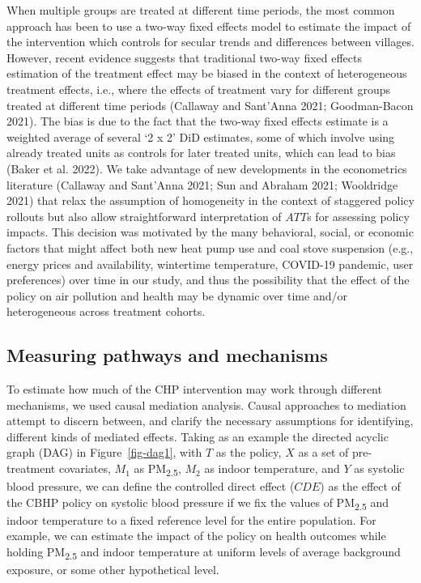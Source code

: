 \documentclass[
  letterpaper,
  DIV=11,
  numbers=noendperiod]{scrartcl}
\begin{document}
When multiple groups are treated at different time periods, the most
common approach has been to use a two-way fixed effects model to
estimate the impact of the intervention which controls for secular
trends and differences between villages. However, recent evidence
suggests that traditional two-way fixed effects estimation of the
treatment effect may be biased in the context of heterogeneous treatment
effects, i.e., where the effects of treatment vary for different groups
treated at different time periods (Callaway and Sant'Anna 2021;
Goodman-Bacon 2021). The bias is due to the fact that the two-way fixed
effects estimate is a weighted average of several `2 x 2' DiD estimates,
some of which involve using already treated units as controls for later
treated units, which can lead to bias (Baker et al. 2022). We take
advantage of new developments in the econometrics literature (Callaway
and Sant'Anna 2021; Sun and Abraham 2021; Wooldridge 2021) that relax
the assumption of homogeneity in the context of staggered policy
rollouts but also allow straightforward interpretation of \(ATT\)s for
assessing policy impacts. This decision was motivated by the many
behavioral, social, or economic factors that might affect both new heat
pump use and coal stove suspension (e.g., energy prices and
availability, wintertime temperature, COVID-19 pandemic, user
preferences) over time in our study, and thus the possibility that the
effect of the policy on air pollution and health may be dynamic over
time and/or heterogeneous across treatment cohorts.

\subsection{Measuring pathways and
mechanisms}\label{measuring-pathways-and-mechanisms}

To estimate how much of the CHP intervention may work through different
mechanisms, we used causal mediation analysis. Causal approaches to
mediation attempt to discern between, and clarify the necessary
assumptions for identifying, different kinds of mediated effects. Taking
as an example the directed acyclic graph (DAG) in Figure~\ref{fig-dag1},
with \(T\) as the policy, \(X\) as a set of pre-treatment covariates,
\(M_{1}\) as PM\textsubscript{2.5}, \(M_{2}\) as indoor temperature, and
\(Y\) as systolic blood pressure, we can define the controlled direct
effect (\(CDE\)) as the effect of the CBHP policy on systolic blood
pressure if we fix the values of PM\textsubscript{2.5} and indoor
temperature to a fixed reference level for the entire population. For
example, we can estimate the impact of the policy on health outcomes
while holding PM\textsubscript{2.5} and indoor temperature at uniform
levels of average background exposure, or some other hypothetical level.
\end{document}
